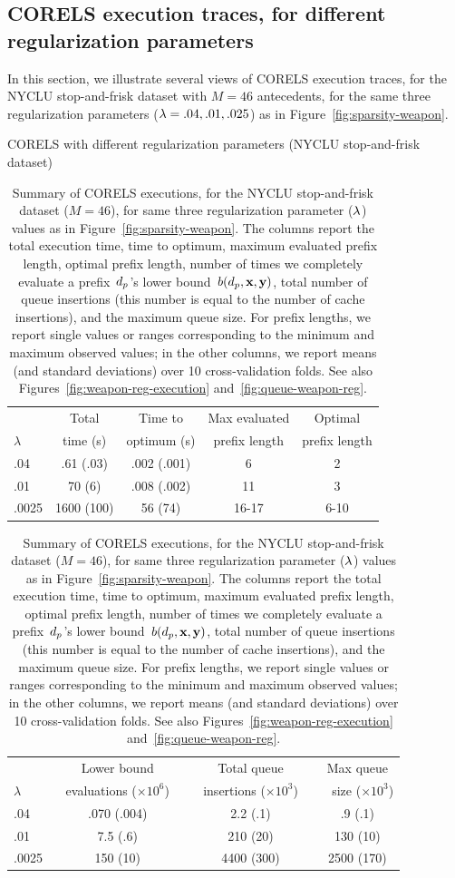 \subsection{CORELS execution traces, for different regularization parameters}
\label{sec:reg-param}
In this section, we illustrate several views of CORELS execution traces,
for the NYCLU stop-and-frisk dataset with ${M = 46}$ antecedents,
for the same three regularization parameters (${{\lambda} = .04, .01, .025}$)
as in Figure~\ref{fig:sparsity-weapon}.

\begin{table}[t!]
\centering
CORELS with different regularization parameters (NYCLU stop-and-frisk dataset) \\
\vspace{2mm}
\begin{tabular}{l | c | c | c | c}
& Total & Time to & Max evaluated & Optimal \\
$\lambda$ & time (s) & optimum (s) & prefix length & prefix length \\
\hline
.04 & .61 (.03) & .002 (.001) & 6 & 2 \\
.01 & 70 (6) & .008 (.002) & 11 & 3 \\
.0025 & 1600 (100) & 56 (74) & 16-17 & 6-10 \\
\hline
\end{tabular}
\begin{tabular}{l | c | c | c}
\hline
& Lower bound & Total queue &  Max queue \\
$\lambda$ &~ evaluations ($\times 10^6$) ~&~ insertions ($\times 10^3$) ~&~ size ($\times 10^3$) \\
\hline
.04 & .070 (.004) & 2.2 (.1) & .9 (.1) \\
.01 & 7.5 (.6) & 210 (20) & 130 (10) \\
.0025 & 150 (10) & 4400 (300) & 2500 (170) \\
\end{tabular}
\caption{Summary of CORELS executions, for the NYCLU stop-and-frisk dataset (${M = 46}$),
for same three regularization parameter (${\lambda}$) values as in Figure~\ref{fig:sparsity-weapon}.
%
The columns report the total execution time,
time to optimum, maximum evaluated prefix length, optimal prefix length,
number of times we completely evaluate a prefix~$d_p$'s lower bound~$b(d_p, \mathbf{x}, \mathbf{y})$,
total number of queue insertions (this number is equal to the number of cache insertions),
and the maximum queue size.
%
For prefix lengths, we report single values or ranges corresponding to the minimum and maximum observed values;
in the other columns, we report means (and standard deviations) over 10 cross-validation folds.
%
See also Figures~\ref{fig:weapon-reg-execution} and~\ref{fig:queue-weapon-reg}.
}
\vspace{4mm}
\label{tab:weapon-reg}
\end{table}

